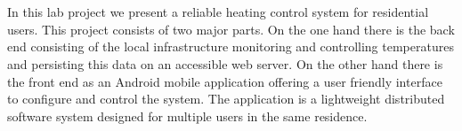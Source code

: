 
\chapter*{\abstractname}
\label{chap:abstract}

In this lab project we present a reliable heating control system for residential users.
This project consists of two major parts.
On the one hand there is the back end consisting of the local infrastructure monitoring and controlling temperatures and persisting this data on an accessible web server.
On the other hand there is the front end as an Android mobile application offering a user friendly interface to configure and control the system. The application is a lightweight distributed software system designed for multiple users in the same residence.